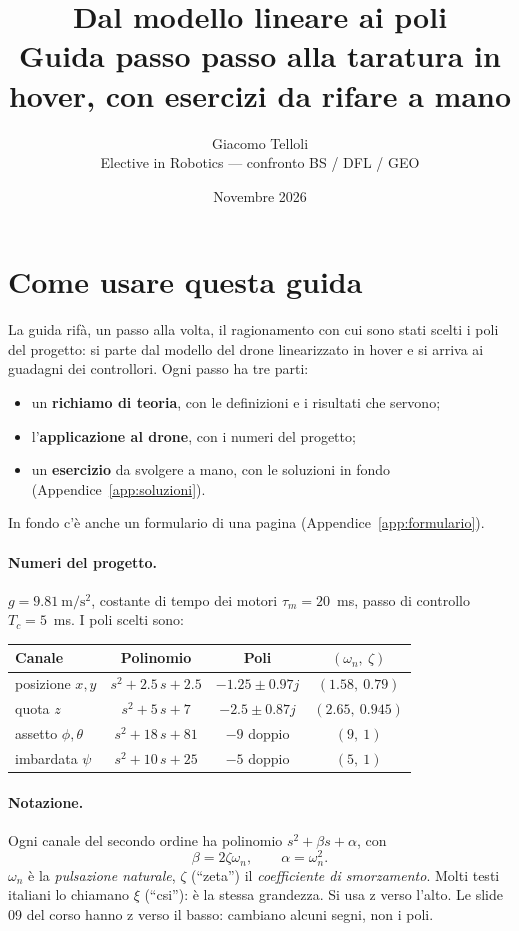 \documentclass[11pt,a4paper]{article}
\title{Dal modello lineare ai poli\\[0.3em]
\large Guida passo passo alla taratura in hover, con esercizi da rifare a mano}
\author{Giacomo Telloli\\[0.2em] \small Elective in Robotics --- confronto BS / DFL / GEO}
\date{Novembre 2026}
\begin{document}
\maketitle

\section*{Come usare questa guida}

La guida rifà, un passo alla volta, il ragionamento con cui sono stati scelti i poli del progetto: si parte dal modello del drone linearizzato in hover e si arriva ai guadagni dei controllori. Ogni passo ha tre parti:
\begin{itemize}
  \item un \textbf{richiamo di teoria}, con le definizioni e i risultati che servono;
  \item l'\textbf{applicazione al drone}, con i numeri del progetto;
  \item un \textbf{esercizio} da svolgere a mano, con le soluzioni in fondo (Appendice~\ref{app:soluzioni}).
\end{itemize}
In fondo c'è anche un formulario di una pagina (Appendice~\ref{app:formulario}).

\paragraph{Numeri del progetto.} $g = 9.81\ \mathrm{m/s^2}$, costante di tempo dei motori $\tau_m = 20$~ms, passo di controllo $T_c = 5$~ms. I poli scelti sono:

\begin{center}
\begin{tabular}{@{}lccc@{}}
\toprule
Canale & Polinomio & Poli & $(\omega_n,\ \zeta)$ \\
\midrule
posizione $x, y$ & $s^2 + 2.5\,s + 2.5$ & $-1.25 \pm 0.97j$ & $(1.58,\ 0.79)$ \\
quota $z$ & $s^2 + 5\,s + 7$ & $-2.5 \pm 0.87j$ & $(2.65,\ 0.945)$ \\
assetto $\phi, \theta$ & $s^2 + 18\,s + 81$ & $-9$ doppio & $(9,\ 1)$ \\
imbardata $\psi$ & $s^2 + 10\,s + 25$ & $-5$ doppio & $(5,\ 1)$ \\
\bottomrule
\end{tabular}
\end{center}

\paragraph{Notazione.} Ogni canale del secondo ordine ha polinomio $s^2 + \beta s + \alpha$, con
\[
\beta = 2\zeta\omega_n, \qquad \alpha = \omega_n^2 .
\]
$\omega_n$ è la \emph{pulsazione naturale}, $\zeta$ (``zeta'') il \emph{coefficiente di smorzamento}. Molti testi italiani lo chiamano $\xi$ (``csi''): è la stessa grandezza. Si usa z verso l'alto. Le slide 09 del corso hanno z verso il basso: cambiano alcuni segni, non i poli.
\end{document}
